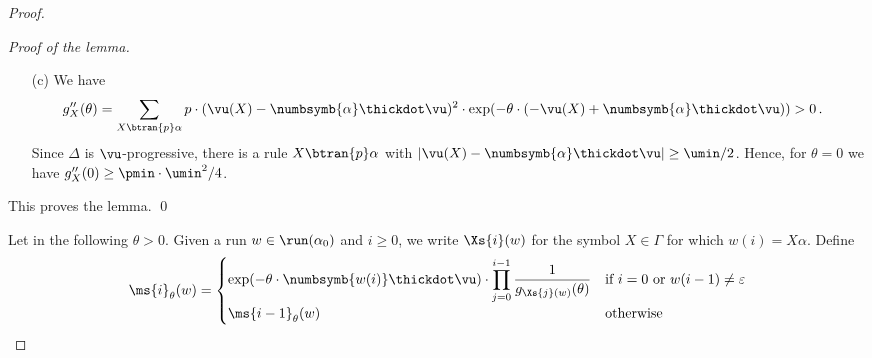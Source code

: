 \begin{proof}
\begin{proof}[Proof of the lemma]
\begin{itemize}
\begin{align*}
{   Then $A \cdot \vu \le \vu$ implies
}
g_X'(0)
     & = \sum_{X\btran{p} \alpha} p \cdot (\vu(X) - \numbsymb{\alpha} \thickdot \vu) \\
     & = \vu(X) - \sum_{X\btran{p} \alpha} p \cdot \numbsymb{\alpha} \thickdot \vu = \vu(X) - A(X) \thickdot \vu\\
     & \ge \vu(X) - \vu(X) = 0\,.
\end{align*}
   The inequality $g_X'(0) < g_X'(\theta)$ follows from~(c).
  \item[(c)]
   We have
   \begin{align*}
    g_X''(\theta)
    & = \sum_{X\btran{p} \alpha} p \cdot (\vu(X) - \numbsymb{\alpha} \thickdot \vu)^2 \cdot \exp(-\theta \cdot (-\vu(X) + \numbsymb{\alpha} \thickdot \vu)) > 0\,.
   \end{align*}
   Since $\Delta$ is $\vu$-progressive, there is a rule $X \btran{p} \alpha$ with $|\vu(X) - \numbsymb{\alpha} \thickdot \vu| \ge \umin/2$.
   Hence, for $\theta = 0$ we have $g_X''(0) \ge \pmin \cdot \umin^2 / 4$.
 \end{itemize}
This proves the lemma.
\qed
\end{proof}

Let in the following $\theta > 0$.
Given a run $w\in \run(\alpha_0)$ and $i\geq 0$, we write $\Xs{i}(w)$ for the symbol $X \in \Gamma$ for which $w(i) = X \alpha$.
Define
 \[
  \ms{i}_\theta(w) =
   \begin{cases} \displaystyle
           \exp(-\theta \cdot \numbsymb{w(i)} \thickdot \vu) \cdot \prod_{j=0}^{i-1} \frac{1}{g_{\Xs{j}(w)}(\theta)} & \text{if $i=0$ or $w(i-1) \ne \varepsilon$} \\
           \ms{i-1}_\theta(w)                                                                                  & \text{otherwise} \\
   \end{cases}
 \]


\end{proof}
